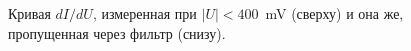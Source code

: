 \documentclass[a4paper, 12pt]{article}
\begin{document}
\begin{figure}[H]
	\centering
	\caption{Кривая $dI/dU$, измеренная при $|U| < 400$~mV (сверху) и она же, пропущенная через фильтр (снизу).}
	\label{fig:3_STS}
\end{figure}
\end{document}
